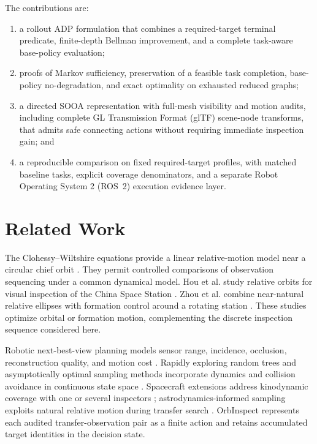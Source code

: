 \documentclass{IEEEtaes}
\theoremstyle{remark}
\theoremstyle{plain}
\begin{document}
The contributions are:
\begin{enumerate}
  \item a rollout ADP formulation that combines a required-target terminal predicate, finite-depth Bellman improvement, and a complete task-aware base-policy evaluation;
  \item proofs of Markov sufficiency, preservation of a feasible task completion, base-policy no-degradation, and exact optimality on exhausted reduced graphs;
  \item a directed SOOA representation with full-mesh visibility and motion audits, including complete GL Transmission Format (glTF) scene-node transforms, that admits safe connecting actions without requiring immediate inspection gain; and
  \item a reproducible comparison on fixed required-target profiles, with matched baseline tasks, explicit coverage denominators, and a separate Robot Operating System 2 (ROS~2) execution evidence layer.
\end{enumerate}


\section{Related Work}
\label{sec:related}

The Clohessy--Wiltshire equations provide a linear relative-motion model near a circular chief orbit \cite{clohessy1960terminal,wertz2011space}. They permit controlled comparisons of observation sequencing under a common dynamical model. Hou et al. study relative orbits for visual inspection of the China Space Station \cite{hou2024relative}. Zhou et al. combine near-natural relative ellipses with formation control around a rotating station \cite{zhou2026formation}. These studies optimize orbital or formation motion, complementing the discrete inspection sequence considered here.

Robotic next-best-view planning models sensor range, incidence, occlusion, reconstruction quality, and motion cost \cite{scott2003view}. Rapidly exploring random trees and asymptotically optimal sampling methods incorporate dynamics and collision avoidance in continuous state space \cite{lavalle1998rapidly,karaman2011sampling}. Spacecraft extensions address kinodynamic coverage with one or several inspectors \cite{faghihi2022kinodynamic,faghihi2023multiple}; astrodynamics-informed sampling exploits natural relative motion during transfer search \cite{deka2023astrodynamics}. OrbInspect represents each audited transfer-observation pair as a finite action and retains accumulated target identities in the decision state.
\end{document}
